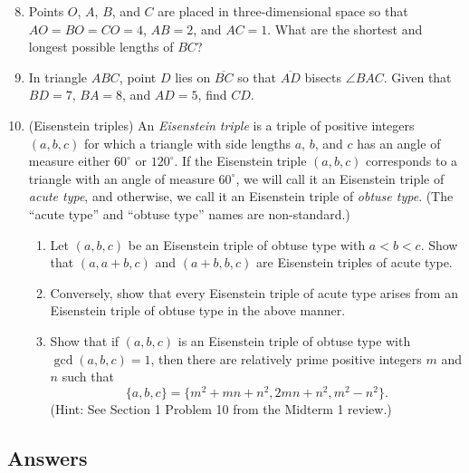 \begin{enumerate}\setcounter{enumi}{7}
\item Points $O$, $A$, $B$, and $C$ are placed in three-dimensional space so that $AO = BO = CO = 4$, $AB = 2$, and $AC = 1$. What are the shortest and longest possible lengths of $BC$?
\item In triangle $ABC$, point $D$ lies on $\overline{BC}$ so that $\overline{AD}$ bisects $\angle BAC$. Given that $BD = 7$, $BA = 8$, and $AD = 5$, find $CD$.
\item (Eisenstein triples) An \emph{Eisenstein triple} is a triple of positive integers $(a,b,c)$ for which a triangle with side lengths $a$, $b$, and $c$ has an angle of measure either $60^{\circ}$ or $120^{\circ}$. If the Eisenstein triple $(a,b,c)$ corresponds to a triangle with an angle of measure $60^{\circ}$, we will call it an Eisenstein triple of \emph{acute type}, and otherwise, we call it an Eisenstein triple of \emph{obtuse type}. (The ``acute type'' and ``obtuse type'' names are non-standard.)
\begin{enumerate}
\item Let $(a,b,c)$ be an Eisenstein triple of obtuse type with $a < b < c$. Show that $(a, a + b, c)$ and $(a + b, b, c)$ are Eisenstein triples of acute type.
\item Conversely, show that every Eisenstein triple of acute type arises from an Eisenstein triple of obtuse type in the above manner.
\item Show that if $(a,b,c)$ is an Eisenstein triple of obtuse type with $\gcd(a,b,c) = 1$, then there are relatively prime positive integers $m$ and $n$ such that
\begin{equation*}
\{a,b,c\} = \{m^2 + mn + n^2, 2mn + n^2, m^2 - n^2\}.
\end{equation*}
(Hint: See Section 1 Problem 10 from the Midterm 1 review.)
\end{enumerate}
\end{enumerate}


\newpage
\subsection{Answers}

